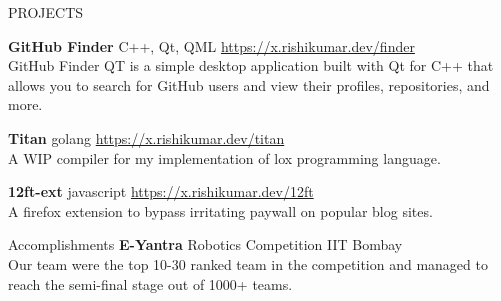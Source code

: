 \documentclass{resume} %
\begin{document}
	\begin{rSection}{PROJECTS}
		\vspace{-1.25em}
		\item \textbf{GitHub Finder} {C++, Qt, QML} \hfill {\href{https://x.rishikumar.dev/finder}{https://x.rishikumar.dev/finder}}\\
			{GitHub Finder QT is a simple desktop application built with Qt for C++ that allows you to search for GitHub users and view their profiles, repositories, and more.} 
		\item \textbf{Titan} {golang} \hfill {\href{https://x.rishikumar.dev/titan}{https://x.rishikumar.dev/titan}}\\
		{A WIP compiler for my implementation of lox programming language.}
		\item \textbf{12ft-ext} {javascript} \hfill {\href{https://x.rishikumar.dev/12ft}{https://x.rishikumar.dev/12ft}}\\
		{A firefox extension to bypass irritating paywall on popular blog sites.}
	\end{rSection} 

	
	\begin{rSection}{Accomplishments} 
		\textbf{E-Yantra} {Robotics Competition} \hfill IIT Bombay\\
		{Our team were the top 10-30 ranked team in the competition and managed to reach the semi-final stage out of 1000+ teams.} 	
	\end{rSection}
\end{document}
